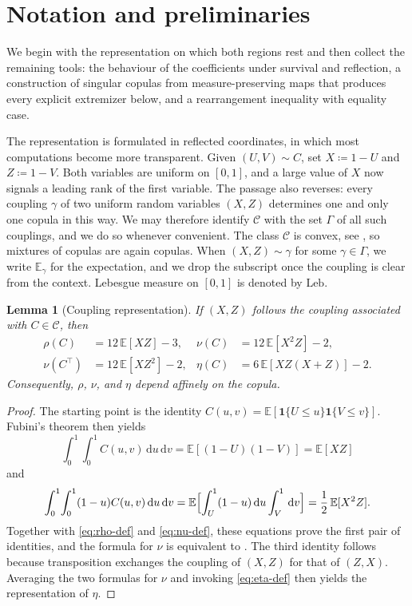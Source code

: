 \documentclass[11pt,a4paper]{article}
\newtheorem{lemma}[theorem]{Lemma}
\theoremstyle{remark}
\newcommand{\E}{\mathbb{E}}
\newcommand{\de}{\,\mathrm{d}}
\newcommand{\1}{\mathbf{1}}
\newcommand{\CC}{\mathcal{C}}
\newcommand{\Gam}{\Gamma}
\begin{document}
\section{Notation and preliminaries}
\label{sec:preliminaries}

We begin with the representation on which both regions rest and then collect the remaining tools: the behaviour of the coefficients under survival and reflection, a construction of singular copulas from measure-preserving maps that produces every explicit extremizer below, and a rearrangement inequality with equality case.

The representation is formulated in reflected coordinates, in which most computations become more transparent.
Given $(U,V)\sim C$, set $X\coloneqq1-U$ and $Z\coloneqq1-V$.
Both variables are uniform on $[0,1]$, and a large value of $X$ now signals a leading rank of the first variable.
The passage also reverses: every coupling $\gamma$ of two uniform random variables $(X,Z)$ determines one and only one copula in this way.
We may therefore identify $\CC$ with the set $\Gam$ of all such couplings, and we do so whenever convenient.
The class $\CC$ is convex, see \cite[Thm.~1.4.5]{durante2016principles}, so mixtures of copulas are again copulas.
When $(X,Z)\sim\gamma$ for some $\gamma\in\Gam$, we write $\E_\gamma$ for the expectation, and we drop the subscript once the coupling is clear from the context.
Lebesgue measure on $[0,1]$ is denoted by $\mathrm{Leb}$.

\begin{lemma}[Coupling representation]
\label{lem:coupling}
If $(X,Z)$ follows the coupling associated with $C\in\CC$, then
\begin{equation}
  \label{eq:coupling-moments}
  \begin{aligned}
  \rho(C)&=12\,\E[XZ]-3,
  &\nu(C)&=12\,\E[X^2Z]-2,\\
  \nu(C^\top)&=12\,\E[XZ^2]-2,
  &\eta(C)&=6\,\E[XZ(X+Z)]-2.
  \end{aligned}
\end{equation}
Consequently, $\rho$, $\nu$, and $\eta$ depend affinely on the copula.
\end{lemma}

\begin{proof}
The starting point is the identity $C(u,v)=\E[\1\{U\le u\}\1\{V\le v\}]$.
Fubini's theorem then yields
\[
  \int_0^1\!\int_0^1C(u,v)\de u\de v
  =\E[(1-U)(1-V)]=\E[XZ]
\]
and
\[
  \int_0^1\!\int_0^1(1-u)C(u,v)\de u\de v
  =\E\Bigl[\int_U^1(1-u)\de u\int_V^1\de v\Bigr]
  =\frac12\,\E[X^2Z].
\]
Together with \eqref{eq:rho-def} and \eqref{eq:nu-def}, these equations prove the first pair of identities, and the formula for $\nu$ is equivalent to \cite[Frm.~(1)]{genest2003blest}.
The third identity follows because transposition exchanges the coupling of $(X,Z)$ for that of $(Z,X)$.
Averaging the two formulas for $\nu$ and invoking \eqref{eq:eta-def} then yields the representation of $\eta$.
\end{proof}
\end{document}
